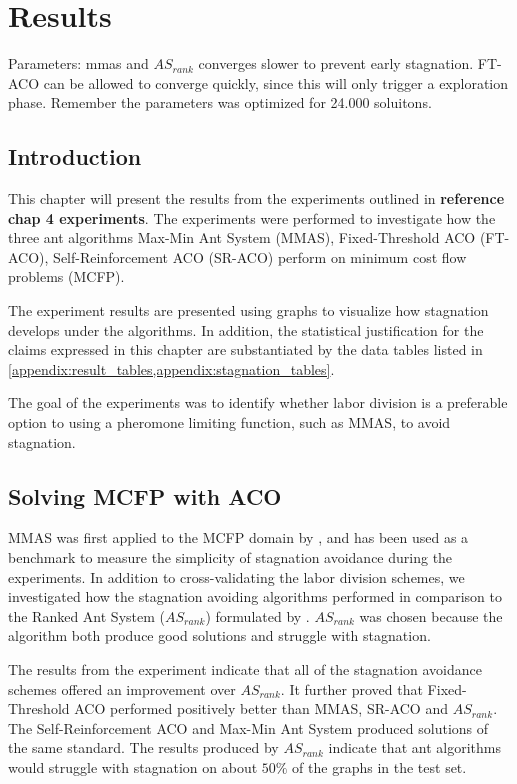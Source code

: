 \graphicspath{{chapters/chapter5/}}

\chapter{Results}
Parameters: mmas and $AS_{rank}$ converges slower to prevent early stagnation. FT-ACO can be allowed to converge quickly, since this will only trigger a exploration phase. Remember the parameters was optimized for 24.000 soluitons.

\section{Introduction}
This chapter will present the results from the experiments outlined in \textbf{reference chap 4 experiments}. The experiments were performed to investigate how the three ant algorithms Max-Min Ant System (MMAS), Fixed-Threshold ACO (FT-ACO), Self-Reinforcement ACO (SR-ACO) perform on minimum cost flow problems (MCFP).

The experiment results are presented using graphs to visualize how stagnation develops under the algorithms. In addition, the statistical justification for the claims expressed in this chapter are substantiated by the data tables listed in \cref{appendix:result_tables,appendix:stagnation_tables}.

The goal of the experiments was to identify whether labor division is a preferable option to using a pheromone limiting function, such as MMAS, to avoid stagnation.

% 


\section{Solving MCFP with ACO}
MMAS was first applied to the MCFP domain by \textcite{Monteiro2011}, and has been used as a benchmark to measure the simplicity of stagnation avoidance during the experiments. In addition to cross-validating the labor division schemes, we investigated how the stagnation avoiding algorithms performed in comparison to the Ranked Ant System ($AS_{rank}$) formulated by \textcite{Bullnheimer1997}. $AS_{rank}$ was chosen because the algorithm both produce good solutions and struggle with stagnation.

The results from the experiment indicate that all of the stagnation avoidance schemes offered an improvement over $AS_{rank}$. It further proved that Fixed-Threshold ACO performed positively better than MMAS, SR-ACO and $AS_{rank}$. The Self-Reinforcement ACO and Max-Min Ant System produced solutions of the same standard. The results produced by $AS_{rank}$ indicate that ant algorithms would struggle with stagnation on about $50\%$ of the graphs in the test set.

